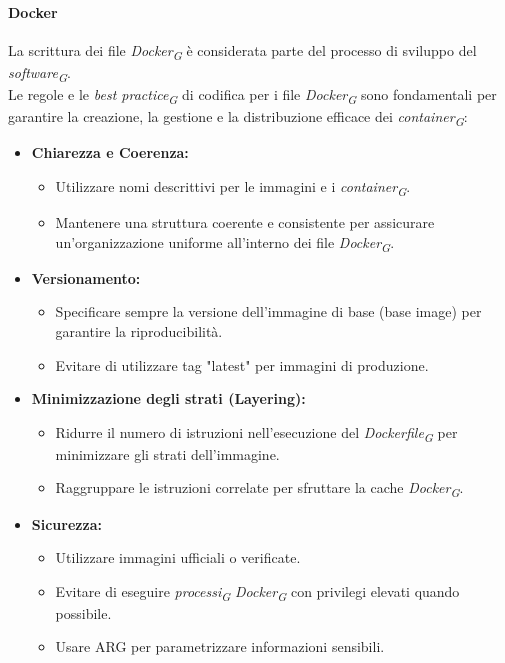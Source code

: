 \paragraph{Docker}

La scrittura dei file \textit{Docker}\textsubscript{\textit{G}} è considerata parte del processo di sviluppo del \textit{software}\textsubscript{\textit{G}}. \\
Le regole e le \textit{best practice}\textsubscript{\textit{G}} di codifica per i file \textit{Docker}\textsubscript{\textit{G}} sono fondamentali per garantire la creazione, la gestione e la distribuzione efficace dei \textit{container}\textsubscript{\textit{G}}:
\begin{itemize}
    \item \textbf{Chiarezza e Coerenza:}
    \begin{itemize}
        \item Utilizzare nomi descrittivi per le immagini e i \textit{container}\textsubscript{\textit{G}}.
        \item Mantenere una struttura coerente e consistente per assicurare un'organizzazione uniforme all'interno dei file \textit{Docker}\textsubscript{\textit{G}}.
    \end{itemize}

\item \textbf{Versionamento:}
    \begin{itemize}
        \item Specificare sempre la versione dell'immagine di base (base image) per garantire la riproducibilità.
        \item Evitare di utilizzare tag "latest" per immagini di produzione.
    \end{itemize}

\item \textbf{Minimizzazione degli strati (Layering):}
    \begin{itemize}
        \item Ridurre il numero di istruzioni nell'esecuzione del \textit{Dockerfile}\textsubscript{\textit{G}} per minimizzare gli strati dell'immagine.
        \item Raggruppare le istruzioni correlate per sfruttare la cache \textit{Docker}\textsubscript{\textit{G}}.
    \end{itemize}

\item \textbf{Sicurezza:}
    \begin{itemize}
        \item Utilizzare immagini ufficiali o verificate.
        \item Evitare di eseguire \textit{processi}\textsubscript{\textit{G}} \textit{Docker}\textsubscript{\textit{G}} con privilegi elevati quando possibile.
        \item Usare ARG per parametrizzare informazioni sensibili.
    \end{itemize}


\end{itemize}

